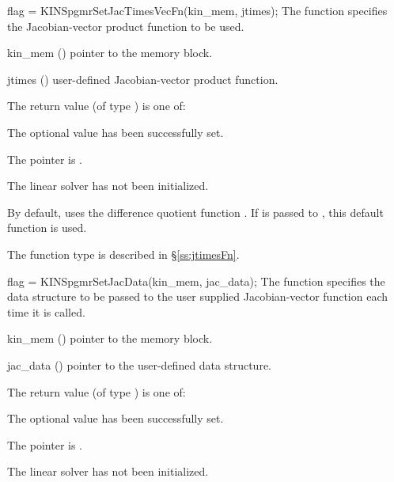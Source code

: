 {}
{
  flag = KINSpgmrSetJacTimesVecFn(kin\_mem, jtimes);
}
{
  The function  specifies the Jacobian-vector 
  product function to be used.
}
{
  \begin{args}
  \item[kin\_mem] ()
    pointer to the {\kinsol} memory block.
  \item[jtimes] ()
    user-defined Jacobian-vector product function.
  \end{args}
}
{
  The return value  (of type ) is one of:
  \begin{args}
  \item[\Id{KINSPGMR\_SUCCESS}] 
    The optional value has been successfully set.
  \item[\Id{KINSPGMR\_MEM\_NULL}]
    The  pointer is .
  \item[\Id{KINSPGMR\_LMEM\_NULL}]
    The {\kinspgmr} linear solver has not been initialized.
  \end{args}
}
{
  By default, {\kinspgmr} uses the difference quotient function .
  If  is passed to , this default function is used.

  The function type  is described in \S\ref{ss:jtimesFn}.
}
{
  flag = KINSpgmrSetJacData(kin\_mem, jac\_data);
}
{
  The function  specifies the data structure
  to be passed to the user supplied Jacobian-vector
  function each time it is called.
}
{
  \begin{args}
  \item[kin\_mem] ()
    pointer to the {\kinsol} memory block.
  \item[jac\_data] ()
     pointer to the user-defined data structure.
  \end{args}
}
{
  The return value  (of type ) is one of:
  \begin{args}
  \item[\Id{KINSPGMR\_SUCCESS}] 
    The optional value has been successfully set.
  \item[\Id{KINSPGMR\_MEM\_NULL}]
    The  pointer is .
  \item[\Id{KINSPGMR\_LMEM\_NULL}]
    The {\kinspgmr} linear solver has not been initialized.
  \end{args}
}
{}


